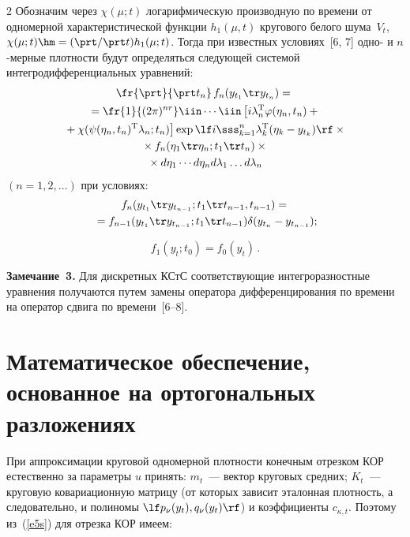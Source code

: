 \begin{multicols}{2}
Обозначим через  $\chi (\mu;t)$ логарифмическую производную по времени 
от одномерной характеристической функции $h_1(\mu, t)$ кругового белого шума~$V_t$,  
$\chi(\mu;t)\hm= (\prt/\prt t) h_1 (\mu ;t)$. Тогда при известных условиях~[6, 7] 
одно- и $n$-мер\-ные плотности будут определяться следующей системой интегродифференциальных 
уравнений:
\begin{multline*}
    \fr{\prt}{\prt t_n}\, f_n (y_{t_1} \tr y_{t_n}) ={}\\
    {}= \fr{1}{(2\pi)^{nr} }
    \iin \cdots\iin \left[ i\lambda_n^{\mathrm{T}} \varphi (\eta_n, t_n) +{}\right.\\
\left.    {}+\chi 
    (\psi (\eta_n, t_n)^{\mathrm{T}} \lambda_n ; t_n)\right] %
\exp \lf i \sss_{k=1}^n \lambda_k^{\mathrm{T}} (\eta_k - y_{t_k}) \rf \times{}\\
{}\times
f_n (\eta_1\tr \eta_n; t_1\tr t_n)\times{}\\
{}\times d\eta_1 \cdots d\eta_n d \lambda_1\ldots d\lambda_n
\end{multline*}
$(n=1,2,\ldots)$ при условиях:
\begin{multline*}
f_n (y_{t_1} \tr y_{t_{n-1}}; t_1\tr t_{n-1}, t_{n-1})={}\\
\!{}= 
f_{n-1} ( y_{t_1}\tr y_{t_{n-1}}; t_1\tr t_{n-1}) \delta (y_{t_n} - y_{t_{n-1}});\hspace*{-1.55534pt} %
\end{multline*}

\vspace*{-12pt}

\noindent
\begin{equation*}
f_1 (y_t; t_0) = f_0 (y_t)\,. %
\end{equation*}

\noindent
\textbf{Замечание~3.} Для дискретных КСтС соответствующие интегроразностные уравнения 
получаются путем замены оператора дифференцирования по времени на оператор сдвига по 
времени~[6--8].

\section{Математическое обеспечение, основанное на ортогональных разложениях}

При аппроксимации круговой одномерной плотности конечным отрезком КОР 
естественно за параметры $u$ принять: $m_t$~--- вектор круговых средних; 
$K_t$~--- круговую ковариационную мат\-ри\-цу (от которых зависит эталонная плот\-ность, 
а следовательно, и полиномы $\lf p_\nu (y_t), q_\nu (y_t)\rf$) и коэффициенты $c_{\kappa, t}$. 
Поэтому из~(\ref{e5s}) для отрезка КОР имеем:




\end{multicols}
